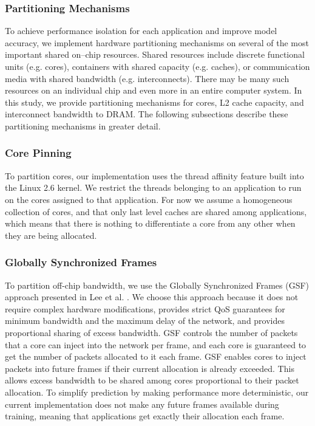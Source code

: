 \subsubsection{Partitioning Mechanisms}
To achieve performance isolation for each application and improve model accuracy, we implement hardware partitioning mechanisms on several of the most important shared on--chip  resources. Shared resources include discrete functional units (e.g. cores), containers with shared capacity (e.g. caches), or communication media with shared bandwidth (e.g. interconnects).  There may be many such resources on an individual chip and even more in an entire computer system. In this study, we provide partitioning mechanisms for cores, L2 cache capacity, and interconnect bandwidth to DRAM. 
 The following subsections describe these partitioning mechanisms in greater detail.
 

\subsubsection*{Core Pinning}
To partition cores, our implementation uses the thread affinity feature built into the Linux 2.6 kernel.  We restrict the threads belonging to an application to run on the cores assigned to that application.  For now we assume a homogeneous collection of cores, and that only last level caches are shared among applications, which means that there is nothing to differentiate a core from any other when they are being allocated. 

\subsubsection*{Globally Synchronized Frames}
To partition off-chip bandwidth, we use the Globally Synchronized Frames (GSF) approach presented in Lee et al. \cite{1382130}.  We choose this approach because it does not require complex hardware modifications, provides strict QoS guarantees for minimum bandwidth and the maximum delay of the network, and provides proportional sharing of excess bandwidth.  GSF controls the number of packets that a core can inject into the network per frame, and each core is guaranteed to get the number of packets allocated to it each frame.  GSF enables cores to inject packets into future frames if their current allocation is already exceeded.  This allows excess bandwidth to be shared among cores proportional to their packet allocation.  To simplify prediction by making performance more deterministic, our current implementation does not make any future frames available during training, meaning that applications get exactly their allocation each frame.

